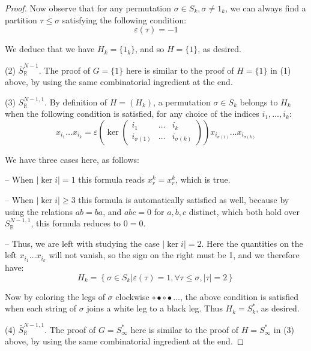 \documentclass[12pt]{amsbook}
\begin{document}
\begin{proof}
Now observe that for any permutation $\sigma\in S_k,\sigma\neq1_k$, we can always find a partition $\tau\leq\sigma$ satisfying the following condition:
$$\varepsilon(\tau)=-1$$

We deduce that we have $H_k=\{1_k\}$, and so $H=\{1\}$, as desired.

\medskip

(2) $\bar{S}^{N-1}_\mathbb R$. The proof of $G=\{1\}$ here is similar to the proof of $H=\{1\}$ in (1) above, by using the same combinatorial ingredient at the end.

\medskip

(3) $S^{N-1,1}_\mathbb R$. By definition of $H=(H_k)$, a permutation $\sigma\in S_k$ belongs to $H_k$ when the following condition is satisfied, for any choice of the indices $i_1,\ldots,i_k$:
$$x_{i_1}\ldots x_{i_k}=\varepsilon\left(\ker\begin{pmatrix}i_1&\ldots&i_k\\ i_{\sigma(1)}&\ldots&i_{\sigma(k)}\end{pmatrix}\right)x_{i_{\sigma(1)}}\ldots x_{i_{\sigma(k)}}$$

We have three cases here, as follows:

\medskip

-- When $|\ker i|=1$ this formula reads $x_r^k=x_r^k$, which is true. 

\medskip

-- When $|\ker i|\geq3$ this formula is automatically satisfied as well, because by using the relations $ab=ba$, and $abc=0$ for $a,b,c$ distinct, which both hold over $S^{N-1,1}_\mathbb R$, this formula reduces to $0=0$. 

\medskip

-- Thus, we are left with studying the case $|\ker i|=2$. Here the quantities on the left $x_{i_1}\ldots x_{i_k}$ will not vanish, so the sign on the right must be 1, and we therefore have:
$$H_k=\left\{\sigma\in S_k\Big|\varepsilon(\tau)=1,\forall\tau\leq\sigma,|\tau|=2\right\}$$

Now by coloring the legs of $\sigma$ clockwise $\circ\bullet\circ\bullet\ldots$, the above condition is satisfied when each string of $\sigma$ joins a white leg to a black leg. Thus $H_k=S_k^*$, as desired.

\medskip

(4) $\bar{S}^{N-1,1}_\mathbb R$. The proof of $G=S_\infty^*$ here is similar to the proof of $H=S_\infty^*$ in (3) above, by using the same combinatorial ingredient at the end.
\end{proof}
\end{document}
